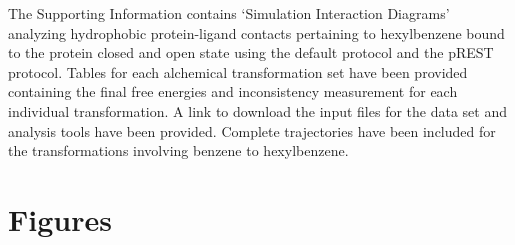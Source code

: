 \documentclass[journal=jctcce,manuscript=article]{achemso}
\begin{document}
\begin{suppinfo}
The Supporting Information contains `Simulation Interaction Diagrams' analyzing hydrophobic protein-ligand contacts pertaining to hexylbenzene bound to the protein closed and open state using the default protocol and the pREST protocol. 
Tables for each alchemical transformation set have been provided containing the final free energies and inconsistency measurement for each individual transformation. 
A link to download the input files for the data set and analysis tools have been provided. 
Complete trajectories have been included for the transformations involving benzene to hexylbenzene.
\end{suppinfo}

\newpage
\section*{Figures}
\end{document}
